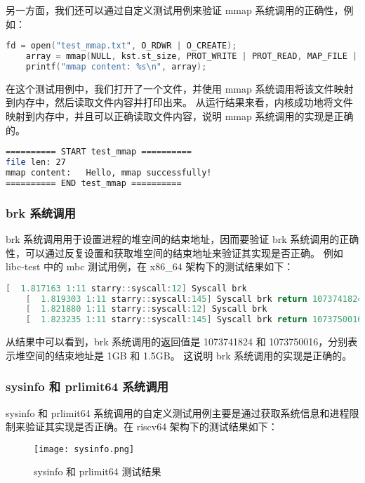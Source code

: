 另一方面，我们还可以通过自定义测试用例来验证 mmap 系统调用的正确性，例如：
\begin{lstlisting}[language=c, caption=自定义 mmap 测试用例]
    fd = open("test_mmap.txt", O_RDWR | O_CREATE);
    array = mmap(NULL, kst.st_size, PROT_WRITE | PROT_READ, MAP_FILE | MAP_SHARED, fd, 0);
    printf("mmap content: %s\n", array);
\end{lstlisting}

在这个测试用例中，我们打开了一个文件，并使用 mmap 系统调用将该文件映射到内存中，然后读取文件内容并打印出来。
从运行结果来看，内核成功地将文件映射到内存中，并且可以正确读取文件内容，说明 mmap 系统调用的实现是正确的。

\begin{lstlisting}[language=bash, caption=自定义 mmap 测试用例结果]
========== START test_mmap ==========
file len: 27
mmap content:   Hello, mmap successfully!
========== END test_mmap ==========
\end{lstlisting}

\subsubsection{brk 系统调用}

brk 系统调用用于设置进程的堆空间的结束地址，因而要验证 brk 系统调用的正确性，可以通过反复设置和获取堆空间的结束地址来验证其实现是否正确。
例如 libc-test 中的 mbc 测试用例，在 x86\_64 架构下的测试结果如下： 
\begin{lstlisting}[language=c, caption=brk]
    [  1.817163 1:11 starry::syscall:12] Syscall brk
    [  1.819303 1:11 starry::syscall:145] Syscall brk return 1073741824
    [  1.821880 1:11 starry::syscall:12] Syscall brk
    [  1.823235 1:11 starry::syscall:145] Syscall brk return 1073750016
\end{lstlisting}

从结果中可以看到，brk 系统调用的返回值是 1073741824 和 1073750016，分别表示堆空间的结束地址是 1GB 和 1.5GB。
这说明 brk 系统调用的实现是正确的。

\subsubsection{sysinfo 和 prlimit64 系统调用}

sysinfo 和 prlimit64 系统调用的自定义测试用例主要是通过获取系统信息和进程限制来验证其实现是否正确。在 riscv64 架构下的测试结果如下：

\begin{figure}
    \centering
    \texttt{[image: sysinfo.png]}
    \caption{sysinfo 和 prlimit64 测试结果}
    \label{fig:sysinfo-test}
\end{figure}

